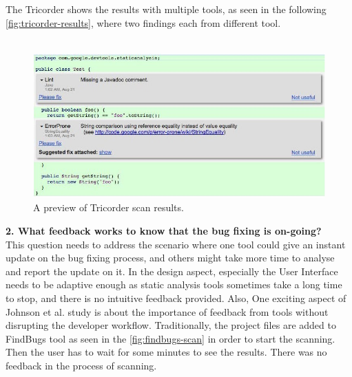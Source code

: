 The Tricorder shows the results with multiple tools, as seen in the following \autoref{fig:tricorder-results}, where two findings each from different tool. \\ \\

\begin{figure}[hbt!]
	\centering
	\includegraphics[width=\linewidth]{figures/Tricorder}
	\caption{A preview of Tricorder scan results. \cite{tricorder}}
	\label{fig:tricorder-results}
\end{figure}

\textbf{2. What feedback works to know that the bug fixing is on-going?} \\

This question needs to address the scenario where one tool could give an instant update on the bug fixing process, and others might take more time to analyse and report the update on it. In the design aspect, especially the User Interface needs to be adaptive \cite{NB18} enough as static analysis tools sometimes take a long time to stop, and there is no intuitive feedback provided. Also, One exciting aspect of Johnson et al. \cite{JSMB13} study is about the importance of feedback from tools without disrupting the developer workflow. Traditionally, the project files are added to FindBugs \cite{findbugs} tool as seen in the \autoref{fig:findbugs-scan} in order to start the scanning. Then the user has to wait for some minutes to see the results. There was no feedback in the process of scanning. \\ \\

